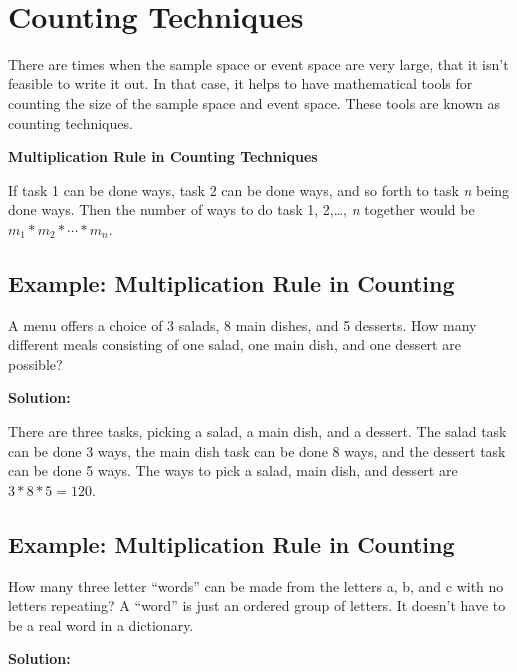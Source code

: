 \documentclass[]{book}
\begin{document}
\textbf{\\
}

\hypertarget{counting-techniques}{%
\section{Counting Techniques}\label{counting-techniques}}

There are times when the sample space or event space are very large, that it isn't feasible to write it out. In that case, it helps to have mathematical tools for counting the size of the sample space and event space. These tools are known as counting techniques.

\textbf{Multiplication Rule in Counting Techniques}

If task 1 can be done ways, task 2 can be done ways, and so forth to task \emph{n} being done ways. Then the number of ways to do task 1, 2,\ldots{}, \emph{n} together would be \(m_{1}*m_{2}*\cdots *m_{n}\).

\hypertarget{example-multiplication-rule-in-counting}{%
\subsection{Example: Multiplication Rule in Counting}\label{example-multiplication-rule-in-counting}}

A menu offers a choice of 3 salads, 8 main dishes, and 5 desserts. How many different meals consisting of one salad, one main dish, and one dessert are possible?

\textbf{Solution:}

There are three tasks, picking a salad, a main dish, and a dessert. The salad task can be done 3 ways, the main dish task can be done 8 ways, and the dessert task can be done 5 ways. The ways to pick a salad, main dish, and dessert are \(3*8*5=120\).

\hypertarget{example-multiplication-rule-in-counting-1}{%
\subsection{Example: Multiplication Rule in Counting}\label{example-multiplication-rule-in-counting-1}}

How many three letter ``words'' can be made from the letters a, b, and c with no letters repeating? A ``word'' is just an ordered group of letters. It doesn't have to be a real word in a dictionary.

\textbf{Solution:}
\end{document}
